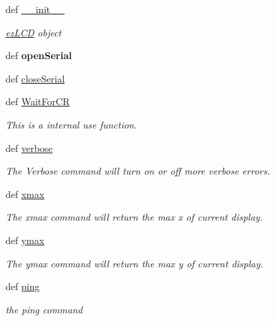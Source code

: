 \begin{DoxyCompactItemize}
\item 
def \hyperlink{namespaceez_l_c_d3xx_a222407eee66a635a2df59ffd7b9c4252}{\-\_\-\-\_\-init\-\_\-\-\_\-}
\begin{DoxyCompactList}\small\item\em \hyperlink{classez_l_c_d3xx_1_1ez_l_c_d}{ez\-L\-C\-D} object \end{DoxyCompactList}\item 
\hypertarget{namespaceez_l_c_d3xx_ae43124104a126749f7775a77e5339ce6}{def {\bfseries open\-Serial}}\label{namespaceez_l_c_d3xx_ae43124104a126749f7775a77e5339ce6}

\item 
def \hyperlink{namespaceez_l_c_d3xx_ac758f44d3aa2892d8946d422282c800c}{close\-Serial}
\item 
def \hyperlink{namespaceez_l_c_d3xx_a685d0b172e0c0099f6dda0fbc4d820ad}{Wait\-For\-C\-R}
\begin{DoxyCompactList}\small\item\em This is a internal use function. \end{DoxyCompactList}\item 
def \hyperlink{group___general_gaa497e8573c045944d589b17fd7dd36ac}{verbose}
\begin{DoxyCompactList}\small\item\em The Verbose command will turn on or off more verbose errors. \end{DoxyCompactList}\item 
def \hyperlink{group___general_gabe06f9371514b4556accd06145b9c104}{xmax}
\begin{DoxyCompactList}\small\item\em The xmax command will return the max x of current display. \end{DoxyCompactList}\item 
def \hyperlink{group___general_gabcb8010d7c29b1c514e70cefe3bb856c}{ymax}
\begin{DoxyCompactList}\small\item\em The ymax command will return the max y of current display. \end{DoxyCompactList}\item 
def \hyperlink{group___general_ga92454899475445ff2d48eb7072f3c94e}{ping}
\begin{DoxyCompactList}\small\item\em the ping command \end{DoxyCompactList}\item 

\end{DoxyCompactItemize}
